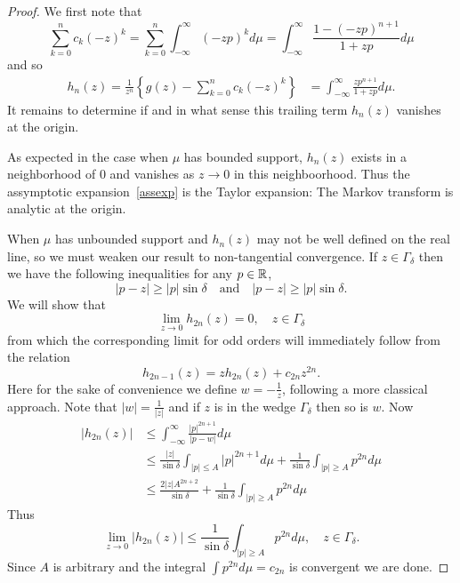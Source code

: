 \begin{proof}
  We first note that 
  \[
    \sum_{k=0}^{n} c_k {(-z)}^k 
    = \sum_{k=0}^{n} \int_{-\infty}^\infty {(-zp)}^k d\mu
    = \int_{-\infty}^\infty \frac{1 - {(-zp)}^{n+1}}{1 + zp} d\mu
  \]
  and so
  \begin{align*}
    h_n(z) = \frac1{z^n}\left\{g(z) - \sum_{k=0}^{n} c_k {(-z)}^k\right\}
    &= \int_{-\infty}^\infty \frac{zp^{n+1}}{1 + zp}d\mu.
  \end{align*}
  It remains to determine if and in what sense this trailing term $h_n(z)$ vanishes at the origin. 

  As expected in the case when $\mu$ has bounded support, $h_n(z)$ exists in a neighborhood of $0$ and vanishes as $z \rightarrow 0$ in this neighboorhood. Thus the assymptotic expansion~\ref{assexp} is the Taylor expansion: The Markov transform is analytic at the origin.

  When $\mu$ has unbounded support and $h_n(z)$ may not be well defined on the real line, so we must weaken our result to non-tangential convergence. If $z \in \Gamma_\delta$ then we have the following inequalities for any $p \in \mathbb{R}$,
  \[
    |p - z| \geq |p| \sin \delta 
    \quad\text{and} \quad
    |p - z| \geq |p| \sin \delta.
  \]
  We will show that
  \[
    \lim_{z \rightarrow 0} h_{2n}(z) = 0, \quad z \in \Gamma_\delta
  \]
  from which the corresponding limit for odd orders will immediately follow from the relation
  \[
    h_{2n-1}(z)
    = zh_{2n}(z) + c_{2n}z^{2n}.
  \] 
  Here for the sake of convenience we define $w = -\frac1z$, following a more classical approach. Note that $|w| = \frac1{|z|}$ and if $z$ is in the wedge $\Gamma_\delta$ then so is $w$. Now 
  \begin{align*}
    |h_{2n}(z)| 
    &\leq \int_{-\infty}^\infty \frac{|p|^{2n+1}}{|p - w|}d\mu \\
    &\leq \frac{|z|}{\sin \delta} \int_{|p| \leq A} |p|^{2n+1} d\mu
    + \frac1{\sin \delta} \int_{|p| \geq A} p^{2n} d\mu \\
    &\leq \frac{2|z| A^{2n+2}}{\sin \delta}
    + \frac1{\sin \delta} \int_{|p| \geq A} p^{2n} d\mu
  \end{align*}
  Thus 
  \[
    \lim_{z \rightarrow 0} |h_{2n}(z)| \leq \frac1{\sin \delta} \int_{|p| \geq A} p^{2n} d\mu, \quad z \in \Gamma_\delta.
  \]
  Since $A$ is arbitrary and the integral $\int p^{2n} d\mu = c_{2n}$ is convergent we are done.
\end{proof}

